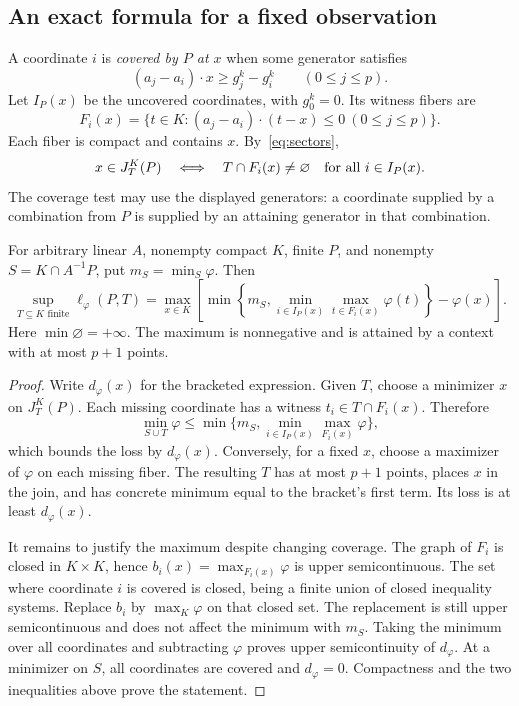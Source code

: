 \subsection{An exact formula for a fixed observation}
A coordinate $i$ is \emph{covered by $P$ at $x$} when some generator satisfies
\[
(a_j-a_i)\cdot x\ge g_j^k-g_i^k\qquad(0\le j\le p).
\]
Let $I_P(x)$ be the uncovered coordinates, with $g_0^k=0$. Its witness fibers are
\begin{equation}\label{eq:fibers}
F_i(x)=\{t\in K:(a_j-a_i)\cdot(t-x)\le0\ (0\le j\le p)\}.
\end{equation}
Each fiber is compact and contains $x$. By~\eqref{eq:sectors},
\begin{equation}\label{eq:missing}
x\in J_T^K(P)\quad\Longleftrightarrow\quad
T\cap F_i(x)\ne\varnothing\quad\hbox{for all }i\in I_P(x).
\end{equation}
The coverage test may use the displayed generators: a coordinate supplied by a combination from $P$ is supplied by an attaining generator in that combination.

\begin{theorem}\label{thm:observation}
For arbitrary linear $A$, nonempty compact $K$, finite $P$, and nonempty $S=K\cap A^{-1}P$, put $m_S=\min_S\varphi$. Then
\begin{equation}\label{eq:observation}
\sup_{T\subseteq K\text{ finite}}\ell_\varphi(P,T)
=\max_{x\in K}\left[\min\left\{m_S,
        \min_{i\in I_P(x)}\max_{t\in F_i(x)}\varphi(t)\right\}-\varphi(x)\right].
\end{equation}
Here $\min\varnothing=+\infty$. The maximum is nonnegative and is attained by a context with at most $p+1$ points.
\end{theorem}
\begin{proof}
Write $d_\varphi(x)$ for the bracketed expression. Given $T$, choose a minimizer $x$ on $J_T^K(P)$. Each missing coordinate has a witness $t_i\in T\cap F_i(x)$. Therefore
\[
\min_{S\cup T}\varphi\le
\min\{m_S,\min_{i\in I_P(x)}\max_{F_i(x)}\varphi\},
\]
which bounds the loss by $d_\varphi(x)$. Conversely, for a fixed $x$, choose a maximizer of $\varphi$ on each missing fiber. The resulting $T$ has at most $p+1$ points, places $x$ in the join, and has concrete minimum equal to the bracket's first term. Its loss is at least $d_\varphi(x)$.

It remains to justify the maximum despite changing coverage. The graph of $F_i$ is closed in $K\times K$, hence $b_i(x)=\max_{F_i(x)}\varphi$ is upper semicontinuous. The set where coordinate $i$ is covered is closed, being a finite union of closed inequality systems. Replace $b_i$ by $\max_K\varphi$ on that closed set. The replacement is still upper semicontinuous and does not affect the minimum with $m_S$. Taking the minimum over all coordinates and subtracting $\varphi$ proves upper semicontinuity of $d_\varphi$. At a minimizer on $S$, all coordinates are covered and $d_\varphi=0$. Compactness and the two inequalities above prove the statement.
\end{proof}


